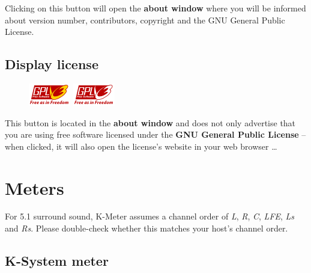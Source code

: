Clicking on this button will open the \textbf{about window} where you
will be informed about version number, contributors, copyright and the
GNU General Public License.

\section{Display license}

\begin{figure}
\includegraphics[scale=\screenshotscale,clip]{include/images/button_gpl_on.png}
\newline \vspace{-0.9\baselineskip}
\includegraphics[scale=\screenshotscale,clip]{include/images/button_gpl_off.png}
\end{figure}

This button is located in the \textbf{about window} and does not only
advertise that you are using free software licensed under the
\textbf{GNU General Public License} -- when clicked, it will also open
the license's website in your web browser \dots

\chapter{Meters}
\label{chap:meters}

For \num{5.1} surround sound, K-Meter assumes a channel order of
\emph{L}, \emph{R}, \emph{C}, \emph{LFE}, \emph{Ls} and \emph{Rs}.
Please double-check whether this matches your host's channel order.

\section{K-System meter}

